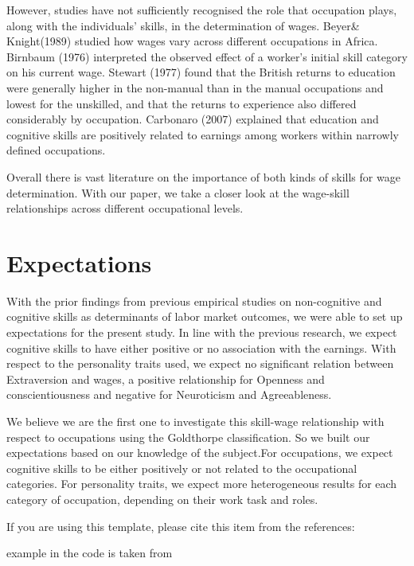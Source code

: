 \documentclass[11pt, a4paper, leqno]{article}
\begin{document}
However, studies have not sufficiently recognised the role that occupation plays, along with the individuals' skills, in the determination of wages. Beyer\& Knight(1989) studied how wages vary across different occupations in Africa. Birnbaum (1976) interpreted the observed effect of a worker's initial skill category on his current wage. Stewart (1977) found that the British returns to education were generally higher in the non-manual than in the manual occupations and lowest for the unskilled, and that the returns to experience also differed considerably by occupation. Carbonaro (2007) explained that education and cognitive skills are positively related to earnings among workers within narrowly defined occupations.

Overall there is vast literature on the importance of both kinds of skills for wage determination. With our paper, we take a closer look at the wage-skill relationships across different occupational levels.


\section*{Expectations}

With the prior findings from previous empirical studies on non-cognitive and cognitive skills as determinants of labor market outcomes, we were able to set up expectations for the present study. 
In line with the previous research, we expect cognitive skills to have either positive or no association with the earnings. With respect to the personality traits used, we expect no significant relation between Extraversion and wages, a positive relationship for Openness and conscientiousness and negative for Neuroticism and Agreeableness.\par

We believe we are the first one to investigate this skill-wage relationship with respect to occupations using the Goldthorpe classification. So we built our expectations based on our knowledge of the subject.For occupations, we expect cognitive skills to be either positively or not related to the occupational categories. For personality traits, we expect more heterogeneous results for each category of occupation, depending on their work task and roles.


If you are using this template, please cite this item from the references: \citet{GaudeckerEconProjectTemplates}

\citet{Schelling69} example in the code is taken from \citet{StachurskiSargent13}
\end{document}
